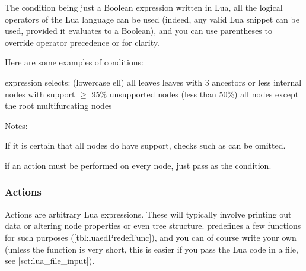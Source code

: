 The condition being just a Boolean expression written in Lua, all the logical
operators of the Lua language can be used (indeed, any valid Lua snippet can be
used, provided it evaluates to a Boolean), and you can use parentheses to
override operator precedence or for clarity.

Here are some examples of \luaed{} conditions:

\startalignment[center]
\starttabulate[cl]
expression \NC selects: \NC\NR
\HL
{} (lowercase ell) \NC all leaves \NC\NR
{} \NC leaves with 3 ancestors or less \NC\NR
{} \NC internal nodes with support $\geq$ 95\% \NC\NR 
{} \NC unsupported nodes (less than 50\%) \NC\NR
{} \NC all nodes except the root \NC\NR
{} \NC multifurcating nodes
\stoptabulate
\stopalignment

Notes:
\startitemize
	\item If it is certain that all nodes do have support, checks such as  can be omitted. 
	\item if an action must be performed on every node, just pass  as
	the condition.
\stopitemize

\subsubsection{Actions}

Actions are arbitrary Lua expressions. These will typically involve printing out
data or altering node properties or even tree structure. \luaed{} predefines a
few functions for such purposes ([tbl:luaedPredefFunc]), and you can
of course write your own (unless the function is very short, this is easier if
you pass the Lua code in a file, see \in{}[sct:lua_file_input]).


